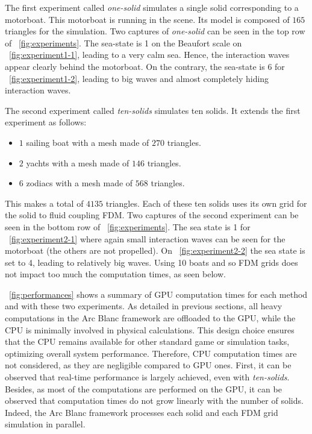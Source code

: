 \documentclass[final]{jcgt}
\def\framework{the Arc Blanc framework\xspace}
\begin{document}
The first experiment called \emph{one-solid} simulates a single solid corresponding to a motorboat.
This motorboat is running in the scene.
Its model is composed of $165$ triangles for the simulation. 
Two captures of \emph{one-solid} can be seen in the top row of \figurename~\ref{fig:experiments}.
The sea-state is 1 on the Beaufort scale on \figurename~\ref{fig:experiment1-1}, leading to a very calm sea.
Hence, the interaction waves appear clearly behind the motorboat. 
On the contrary, the sea-state is 6 for \figurename~\ref{fig:experiment1-2}, leading to big waves and almost completely hiding interaction waves.

The second experiment called \emph{ten-solids} simulates ten solids.
It extends the first experiment as follows:
\begin{itemize}
	\item $1$ sailing boat with a mesh made of $270$ triangles.
	\item $2$ yachts with a mesh made of $146$ triangles.
	\item $6$ zodiacs with a mesh made of $568$ triangles.
\end{itemize} 
This makes a total of $4135$ triangles. 
Each of these ten solids uses its own grid for the solid to fluid coupling FDM. 
Two captures of the second experiment can be seen in the bottom row of \figurename~\ref{fig:experiments}.
The sea state is 1 for \figurename~\ref{fig:experiment2-1} where again small interaction waves can be seen for the motorboat (the others are not propelled). 
On \figurename~\ref{fig:experiment2-2} the sea state is set to 4, leading to relatively big waves.
Using 10 boats and so FDM grids does not impact too much the computation times, as seen below.

\tablename~\ref{fig:performances} shows a summary of GPU computation times for each method and with these two experiments. 
As detailed in previous sections, all heavy computations in \framework are offloaded to the GPU, while the CPU is minimally involved in physical calculations. This design choice ensures that the CPU remains available for other standard game or simulation tasks, optimizing overall system performance. Therefore, CPU computation times are not considered, as they are negligible compared to GPU ones. 
First, it can be observed that real-time performance is largely achieved, even with \emph{ten-solids}. 
Besides, as most of the computations are performed on the GPU, it can be observed that computation times do not grow linearly with the number of solids. 
Indeed, \framework processes each solid and each FDM grid simulation in parallel.
\end{document}
